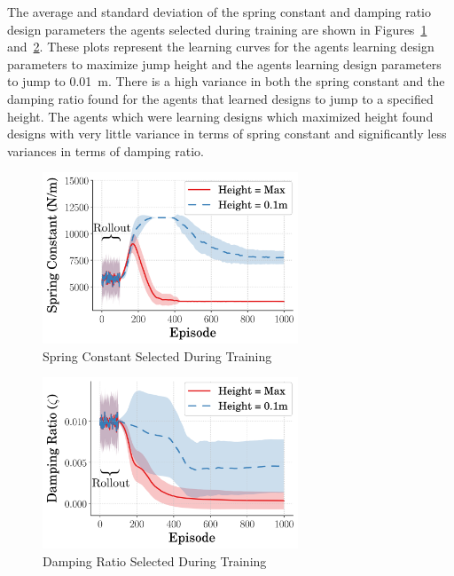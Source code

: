 \documentclass[10pt,twocolumn,letterpaper]{article}
\begin{document}
The average and standard deviation of the spring constant and damping ratio design parameters the agents selected during training are shown in Figures~\ref{fig:spring_vs_step_close} and~\ref{fig:zeta_vs_step_close}. These plots represent the learning curves for the agents learning design parameters to maximize jump height and the agents learning design parameters to jump to 0.01~m. There is a high variance in both the spring constant and the damping ratio found for the agents that learned designs to jump to a specified height. The agents which were learning designs which maximized height found designs with very little variance in terms of spring constant and significantly less variances in terms of damping ratio.
%
\begin{figure}[tb]
        \begin{center}
        \includegraphics[width = 3in]{figures/design_space_narr/SpringVsTime.png}  
        \caption{Spring Constant Selected During Training}
        \label{fig:spring_vs_step_close}
        \end{center}
        \end{figure}
%
\begin{figure}[tb]
        \begin{center}
        \includegraphics[width = 3in]{figures/design_space_narr/ZetaVsTime.png}  
        \caption{Damping Ratio Selected During Training}
        \label{fig:zeta_vs_step_close}
        \end{center}
        \end{figure}
%
\end{document}
